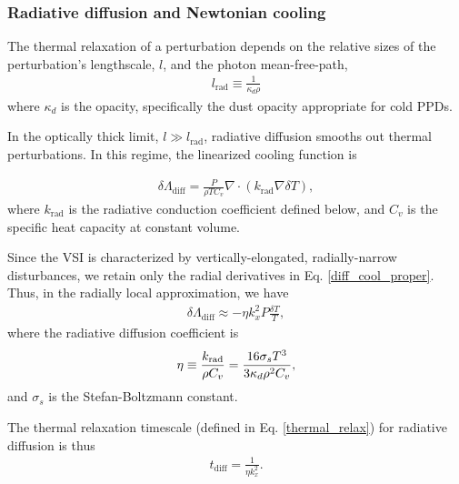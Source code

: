 \subsubsection{Radiative diffusion and Newtonian cooling}
The thermal relaxation of a perturbation depends on the relative sizes of the perturbation's 
lengthscale, $l$, and the photon mean-free-path,
\begin{align}\label{lrad}
  l_\mathrm{rad} \equiv \frac{1}{\kappa_d\rho} 
\end{align}
where $\kappa_d$ is the opacity, specifically the dust opacity appropriate for cold PPDs. 

In the optically thick limit, $l\gg l_\mathrm{rad}$, radiative diffusion smooths out thermal perturbations.
In this regime, the linearized cooling function is

\begin{align}\label{diff_cool_proper}
  \delta \Lambda_\mathrm{diff} = \frac{P}{\rho T C_v} \nabla\cdot\left(k_\mathrm{rad}\nabla\delta
    T\right),  
\end{align}
where $k_\mathrm{rad}$ is the radiative conduction coefficient defined
below, and $C_v$ is the specific heat capacity at constant volume. 

Since the VSI is characterized by vertically-elongated,
radially-narrow disturbances, we retain only the radial derivatives in Eq. \ref{diff_cool_proper}.
Thus, in the radially local approximation, we have
\begin{align}\label{diff_cool_approx}
  \delta\Lambda_\mathrm{diff} \approx %
  -\eta k_x^2 P \frac{\delta T}{T}, %
\end{align}
where the radiative diffusion coefficient is
\begin{align}\label{eta_def}
  \eta \equiv {k_\mathrm{rad} \over \rho C_v} = \frac{16\sigma_s T^3}{3\kappa_d\rho^2 C_v}, 
\end{align}
and $\sigma_s$ is the Stefan-Boltzmann constant. 

The thermal relaxation  timescale (defined in Eq. \ref{thermal_relax}) 
for radiative diffusion is thus 
\begin{align}\label{tc_diff_cool} 
  t_\mathrm{diff} = \frac{1}{\eta k_x^2}.%
\end{align}

